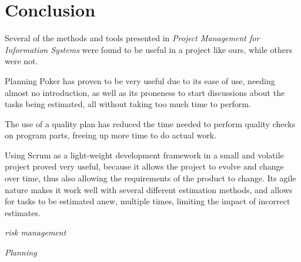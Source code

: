 \section{Conclusion}

Several of the methods and tools presented in \emph{Project Management for
Information Systems}\cite{caye} were found to be useful in a project like ours,
while others were not.

Planning Poker has proven to be very useful due to its ease of use, needing
almost no introduction, as well as its proneness to start discussions about the
tasks being estimated, all without taking too much time to perform.

The use of a quality plan has reduced the time needed to perform quality checks
on program parts, freeing up more time to do actual work.

Using Scrum as a light-weight development framework in a small and volatile
project proved very useful, because it allows the project to evolve and change
over time, thus also allowing the requirements of the product to change. Its
agile nature makes it work well with several different estimation methods, and
allows for tasks to be estimated anew, multiple times, limiting the impact of
incorrect estimates.

\emph{risk management}

\emph{Planning}

